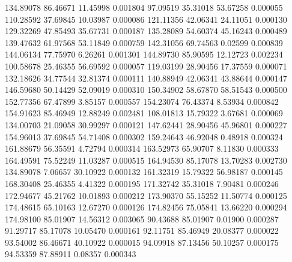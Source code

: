      134.89078       86.46671       11.45998       0.001804
       97.09519       35.31018       53.67258       0.000055
      110.28592       37.69845       10.03987       0.000086
      121.11356       42.06341       24.11051       0.000130
      129.32269       47.85493       35.67731       0.000187
      135.28089       54.60374       45.16243       0.000489
      139.47632       61.97568       53.11849       0.000759
      142.31056       69.74563        0.02599       0.000839
      144.06134       77.75970        6.26261       0.001301
      144.89730       85.90595       12.12723       0.002234
      100.58678       25.46355       56.69592       0.000057
      119.03199       28.90456       17.37559       0.000071
      132.18626       34.77544       32.81374       0.000111
      140.88949       42.06341       43.88644       0.000147
      146.59680       50.14429       52.09019       0.000310
      150.34902       58.67870       58.51543       0.000500
      152.77356       67.47899        3.85157       0.000557
      154.23074       76.43374        8.53934       0.000842
      154.91623       85.46949       12.88249       0.002481
      108.01813       15.79322        3.67681       0.000069
      134.00703       21.09058       30.99297       0.000121
      147.62441       28.90456       45.96801       0.000227
      154.96013       37.69845       54.71408       0.000302
      159.24643       46.92048        0.48918       0.000324
      161.88679       56.35591        4.72794       0.000314
      163.52973       65.90707        8.11830       0.000333
      164.49591       75.52249       11.03287       0.000515
      164.94530       85.17078       13.70283       0.002730
      134.89078        7.06657       30.10922       0.000132
      161.32319       15.79322       56.98187       0.000145
      168.30408       25.46355        4.41322       0.000195
      171.32742       35.31018        7.90481       0.000246
      172.94677       45.21762       10.01893       0.000212
      173.90370       55.15252       11.50774       0.000125
      174.48615       65.10163       12.67270       0.000126
      174.82456       75.05841       13.66220       0.000294
      174.98100       85.01907       14.56312       0.003065
       90.43688       85.01907        0.01900       0.000287
       91.29717       85.17078       10.05470       0.000161
       92.11751       85.46949       20.08377       0.000022
       93.54002       86.46671       40.10922       0.000015
       94.09918       87.13456       50.10257       0.000175
       94.53359       87.88911        0.08357       0.000343
